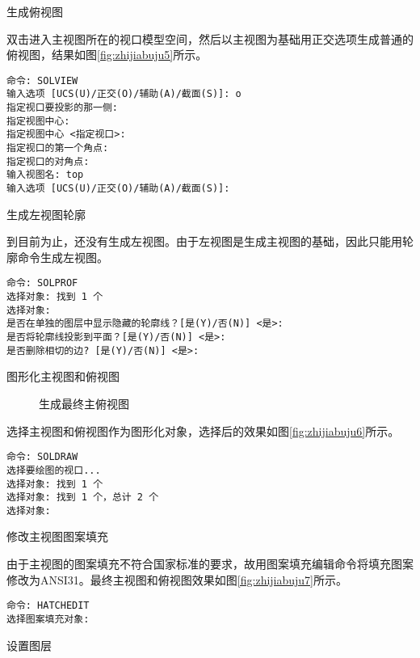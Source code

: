 \begin{procedure}
\item 生成俯视图

双击进入主视图所在的视口模型空间，然后以主视图为基础用正交选项生成普通的俯视图，结果如图\ref{fig:zhijiabuju5}所示。

\begin{lstlisting}
命令: SOLVIEW
输入选项 [UCS(U)/正交(O)/辅助(A)/截面(S)]: o
指定视口要投影的那一侧:
指定视图中心:
指定视图中心 <指定视口>:
指定视口的第一个角点:
指定视口的对角点:
输入视图名: top
输入选项 [UCS(U)/正交(O)/辅助(A)/截面(S)]:
\end{lstlisting}

\item 生成左视图轮廓

到目前为止，还没有生成左视图。由于左视图是生成主视图的基础，因此只能用轮廓命令生成左视图。

\begin{lstlisting}
命令: SOLPROF
选择对象: 找到 1 个
选择对象:
是否在单独的图层中显示隐藏的轮廓线？[是(Y)/否(N)] <是>:
是否将轮廓线投影到平面？[是(Y)/否(N)] <是>:
是否删除相切的边? [是(Y)/否(N)] <是>:
\end{lstlisting}

\item 图形化主视图和俯视图

\begin{figure}[htbp]
\centering
{}\hspace{20pt}
\caption{生成最终主俯视图}
\end{figure} 

选择主视图和俯视图作为图形化对象，选择后的效果如图\ref{fig:zhijiabuju6}所示。

\begin{lstlisting}
命令: SOLDRAW
选择要绘图的视口...
选择对象: 找到 1 个
选择对象: 找到 1 个，总计 2 个
选择对象:
\end{lstlisting}

\item 修改主视图图案填充

由于主视图的图案填充不符合国家标准的要求，故用图案填充编辑命令将填充图案修改为ANSI31。最终主视图和俯视图效果如图\ref{fig:zhijiabuju7}所示。

\begin{lstlisting}
命令: HATCHEDIT
选择图案填充对象:
\end{lstlisting}

\item 设置图层


\end{procedure}

